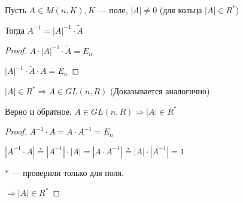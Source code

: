 \follow Пусть $A \in M(n, K), K$ --- поле, $|A| \neq 0$ (для кольца $|A| \in R^*$)

    Тогда $A^{-1} = |A|^{-1} \cdot \widetilde{A}$
    \begin{proof}
        $A \cdot |A|^{-1} \cdot \widetilde{A} = E_n$
        
        $|A|^{-1} \cdot \widetilde{A} \cdot A = E_n$
    \end{proof}

\follow $|A| \in R^* \Longrightarrow A \in GL (n, R)$ (Доказывается аналогично)

\notice Верно и обратное. $A \in GL(n, R) \Longrightarrow |A| \in R^*$
    \begin{proof}
        $A^{-1} \cdot A = A \cdot A^{-1} = E_n$ 

        $|A^{-1} \cdot A| \stackrel{*}{=} |A^{-1}| \cdot |A| = |A \cdot A^{-1}| \stackrel{*}{=} |A| \cdot |A^{-1}| = 1$

        $*$ --- проверили только для поля.

        $\Longrightarrow |A| \in R^*$ 
        
    \end{proof}
